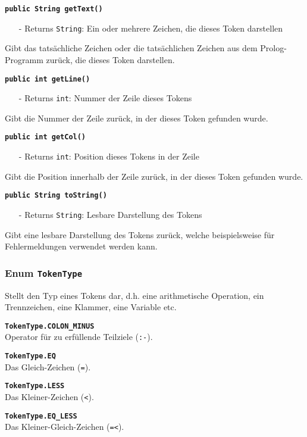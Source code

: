 \documentclass[parskip=full,11pt,twoside]{scrartcl}
\begin{document}
\textbf{\texttt{public String getText()}}
\begin{itemize}[noitemsep]
	\item[-] Returns \texttt{String}: Ein oder mehrere Zeichen, die dieses Token darstellen
\end{itemize}
Gibt das tatsächliche Zeichen oder die tatsächlichen Zeichen aus dem Prolog-Programm zurück, die dieses Token darstellen.

\textbf{\texttt{public int getLine()}}
\begin{itemize}[noitemsep]
	\item[-] Returns \texttt{int}: Nummer der Zeile dieses Tokens
\end{itemize}
Gibt die Nummer der Zeile zurück, in der dieses Token gefunden wurde.

\textbf{\texttt{public int getCol()}}
\begin{itemize}[noitemsep]
	\item[-] Returns \texttt{int}: Position dieses Tokens in der Zeile
\end{itemize}
Gibt die Position innerhalb der Zeile zurück, in der dieses Token gefunden wurde.

\textbf{\texttt{public String toString()}}
\begin{itemize}[noitemsep]
	\item[-] Returns \texttt{String}: Lesbare Darstellung des Tokens
\end{itemize}
Gibt eine lesbare Darstellung des Tokens zurück, welche beispielsweise für Fehlermeldungen verwendet werden kann.

\subsubsection{Enum \texttt{TokenType}}

Stellt den Typ eines Tokens dar, d.h. eine arithmetische Operation, ein Trennzeichen, eine Klammer, eine Variable etc.

\textbf{\texttt{TokenType.COLON\_MINUS}}\\
Operator für zu erfüllende Teilziele (\texttt{:-}).

\textbf{\texttt{TokenType.EQ}}\\
Das Gleich-Zeichen (\texttt{=}).

\textbf{\texttt{TokenType.LESS}}\\
Das Kleiner-Zeichen (\texttt{<}).

\textbf{\texttt{TokenType.EQ\_LESS}}\\
Das Kleiner-Gleich-Zeichen (\texttt{=<}).
\end{document}
